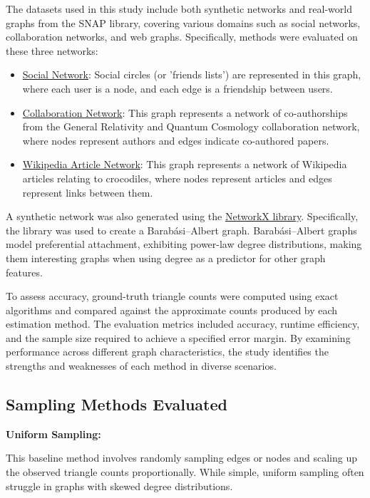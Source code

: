 \documentclass[11pt]{article}
\newcommand{\subsubsubsection}[1]{
  \vspace{1em} %
  \noindent\textbf{#1} %
  \vspace{0.5em} %
}
\begin{document}
The datasets used in this study include both synthetic networks and real-world graphs from the SNAP library, covering various domains such as social networks, collaboration networks, and web graphs.
Specifically, methods were evaluated on these three networks:

\begin{itemize}
    \item \href{https://snap.stanford.edu/data/ego-Facebook.html}{Social Network}: Social circles (or 'friends lists') are represented in this graph, where each user is a node, and each edge is a friendship between users.
    \item \href{https://snap.stanford.edu/data/ca-GrQc.html}{Collaboration Network}: This graph represents a network of co-authorships from the General Relativity and Quantum Cosmology collaboration network, where nodes represent authors and edges indicate co-authored papers.
    \item \href{https://snap.stanford.edu/data/wikipedia-article-networks.html}{Wikipedia Article Network}: This graph represents a network of Wikipedia articles relating to crocodiles, where nodes represent articles and edges represent links between them.
\end{itemize}

A synthetic network was also generated using the \href{https://networkx.org/}{NetworkX library}.
Specifically, the library was used to create a Barabási–Albert \cite{albert_statistical_2002} graph.
Barabási–Albert graphs model preferential attachment, exhibiting power-law degree distributions, making them interesting graphs when using degree as a predictor for other graph features.

To assess accuracy, ground-truth triangle counts were computed using exact algorithms and compared against the approximate counts produced by each estimation method.
The evaluation metrics included accuracy, runtime efficiency, and the sample size required to achieve a specified error margin.
By examining performance across different graph characteristics, the study identifies the strengths and weaknesses of each method in diverse scenarios.

\subsection{Sampling Methods Evaluated}

\subsubsubsection{Uniform Sampling:}

This baseline method involves randomly sampling edges or nodes and scaling up the observed triangle counts proportionally.
While simple, uniform sampling often struggle in graphs with skewed degree distributions.
\end{document}
